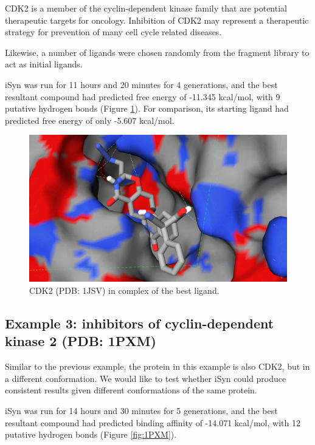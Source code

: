 CDK2 is a member of the cyclin-dependent kinase family that are potential therapeutic targets for oncology. Inhibition of CDK2 may represent a therapeutic strategy for prevention of many cell cycle related diseases.

Likewise, a number of ligands were chosen randomly from the fragment library to act as initial ligands.

iSyn was run for 11 hours and 20 minutes for 4 generations, and the best resultant compound had predicted free energy of -11.345 kcal/mol, with 9 putative hydrogen bonds (Figure \ref{fig:1JSV}). For comparison, its starting ligand had predicted free energy of only -5.607 kcal/mol.

\begin{figure}
\begin{center}
\includegraphics[width=\linewidth]{../isyn/1JSV.png}
\end{center}
\caption{CDK2 (PDB: 1JSV) in complex of the best ligand.}
\label{fig:1JSV}
\end{figure}

\subsection{Example 3: inhibitors of cyclin-dependent kinase 2 (PDB: 1PXM)}

Similar to the previous example, the protein in this example is also CDK2, but in a different conformation. We would like to test whether iSyn could produce consistent results given different conformations of the same protein.

iSyn was run for 14 hours and 30 minutes for 5 generations, and the best resultant compound had predicted binding affinity of -14.071 kcal/mol, with 12 putative hydrogen bonds (Figure \ref{fig:1PXM}).
 
